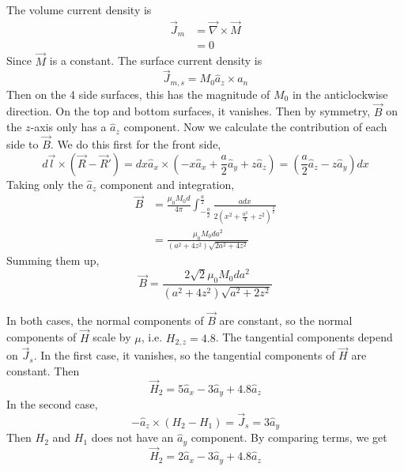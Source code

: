\documentclass[answers]{exam}
\begin{document}
\begin{questions}
\begin{solution}
    The volume current density is
    \begin{align*}
        \vec J_m &= \vec\nabla \times \vec M \\
                 &= 0
    \end{align*}
    Since $\vec M$ is a constant. The surface current density is
    $$\vec J_{m,s} = M_0\hat a_z \times a_n$$
    Then on the 4 side surfaces, this has the magnitude of $M_0$ in the anticlockwise direction. On the top and bottom surfaces, it vanishes. Then by symmetry, $\vec B$ on the $z$-axis only has a $\hat a_z$ component. Now we calculate the contribution of each side to $\vec B$. We do this first for the front side,
    $$d\vec l \times (\vec R - \vec R') = dx\hat a_x \times \left(-x\hat a_x + \frac{a}{2}\hat a_y + z\hat a_z\right) = (\frac{a}{2} \hat a_z - z \hat a_y)dx$$
    Taking only the $\hat a_z$ component and integration,
    \begin{align*}
        \vec B &= \frac{\mu_0 M_0 d}{4\pi} \int_{-\frac{a}{2}}^{\frac{a}{2}} \frac{adx}{2(x^2 + \frac{a^2}{4} + z^2)^{\frac{3}{2}}} \\
               &= \frac{\mu_0M_0da^2}{(a^2+4z^2)\sqrt{2a^2+4z^2}}
    \end{align*}
    Summing them up,
    $$\vec B = \frac{2\sqrt{2}\mu_0M_0da^2}{(a^2+4z^2)\sqrt{a^2+2z^2}}$$
\end{solution}


\begin{solution}
    In both cases, the normal components of $\vec B$ are constant, so the normal components of $\vec H$ scale by $\mu$, i.e. $H_{2,z} = 4.8$. The tangential components depend on $\vec J_s$. In the first case, it vanishes, so the tangential components of $\vec H$ are constant. Then
    $$\vec H_2 = 5\hat a_x - 3\hat a_y + 4.8\hat a_z$$
    In the second case,
    $$-\hat a_z \times (H_2 - H_1) = \vec J_s = 3\hat a_y$$
    Then $H_2$ and $H_1$ does not have an $\hat a_y$ component. By comparing terms, we get
    $$\vec H_2 = 2\hat a_x - 3\hat a_y + 4.8 \hat a_z$$
\end{solution}


\end{questions}
\end{document}

